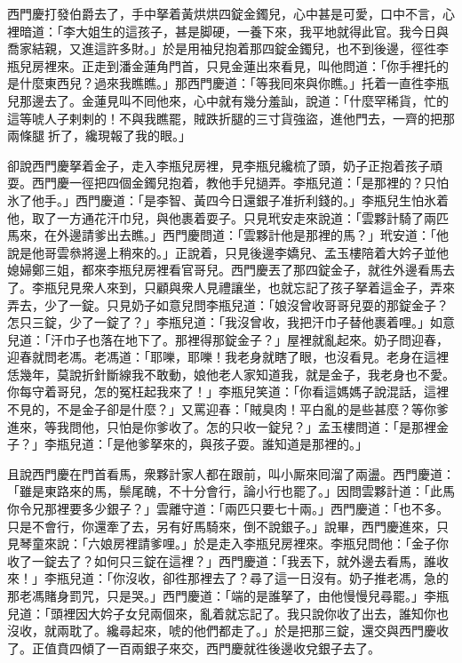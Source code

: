 西門慶打發伯爵去了，手中拏着黃烘烘四錠金鐲兒，心中甚是可愛，口中不言，心裡暗道：「李大姐生的這孩子，甚是脚硬，一養下來，我平地就得此官。我今日與喬家結親，又進這許多財。」於是用袖兒抱着那四錠金鐲兒，也不到後邊，徑徃李瓶兒房裡來。正走到潘金蓮角門首，只見金蓮出來看見，叫他問道：「你手裡托的是什麼東西兒？過來我瞧瞧。」那西門慶道：「等我囘來與你瞧。」托着一直徃李瓶兒那邊去了。{}金蓮見叫不囘他來，心中就有幾分羞訕，說道：「什麼罕稀貨，忙的這等唬人子剌剌的！不與我瞧罷，賊跌折腿的三寸貨強盜，進他門去，一齊的把那兩條腿𢱉折了，纔現報了我的眼。」

卻說西門慶拏着金子，走入李瓶兒房裡，見李瓶兒纔梳了頭，奶子正抱着孩子頑耍。西門慶一徑把四個金鐲兒抱着，教他手兒撾弄。李瓶兒道：「是那裡的？只怕氷了他手。」西門慶道：「是李智、黃四今日還銀子准折利錢的。」李瓶兒生怕氷着他，取了一方通花汗巾兒，與他裹着耍子。只見玳安走來說道：「雲夥計騎了兩匹馬來，在外邊請爹出去瞧。」西門慶問道：「雲夥計他是那裡的馬？」玳安道：「他說是他哥雲叅將邊上稍來的。」正說着，只見後邊李嬌兒、孟玉樓陪着大妗子並他媳婦鄭三姐，都來李瓶兒房裡看官哥兒。西門慶丟了那四錠金子，就徃外邊看馬去了。李瓶兒見衆人來到，只顧與衆人見禮讓坐，也就忘記了孩子拏着這金子，弄來弄去，少了一錠。只見奶子如意兒問李瓶兒道：「娘沒曾收哥哥兒耍的那錠金子？怎只三錠，少了一錠了？」李瓶兒道：「我沒曾收，我把汗巾子替他裹着哩。」如意兒道：「汗巾子也落在地下了。那裡得那錠金子？」屋裡就亂起來。奶子問迎春，迎春就問老馮。老馮道：「耶嚛，耶嚛！我老身就瞎了眼，也沒看見。老身在這裡恁幾年，莫說折針斷線我不敢動，娘他老人家知道我，就是金子，我老身也不愛。你每守着哥兒，怎的冤枉起我來了！」李瓶兒笑道：「你看這媽媽子說混話，這裡不見的，不是金子卻是什麼？」又罵迎春：「賊臭肉！平白亂的是些甚麼？等你爹進來，等我問他，只怕是你爹收了。怎的只收一錠兒？」孟玉樓問道：「是那裡金子？」李瓶兒道：「是他爹拏來的，與孩子耍。誰知道是那裡的。」

且說西門慶在門首看馬，衆夥計家人都在跟前，叫小厮來囘溜了兩盪。西門慶道：「雖是東路來的馬，鬃尾醜，不十分會行，論小行也罷了。」因問雲夥計道：「此馬你令兄那裡要多少銀子？」雲離守道：「兩匹只要七十兩。」西門慶道：「也不多。只是不會行，你還牽了去，另有好馬騎來，倒不說銀子。」說畢，西門慶進來，只見琴童來說：「六娘房裡請爹哩。」於是走入李瓶兒房裡來。李瓶兒問他：「金子你收了一錠去了？如何只三錠在這裡？」西門慶道：「我丟下，就外邊去看馬，誰收來！」李瓶兒道：「你沒收，卻徃那裡去了？尋了這一日沒有。奶子推老馮，急的那老馮賭身罰咒，只是哭。」西門慶道：「端的是誰拏了，由他慢慢兒尋罷。」李瓶兒道：「頭裡因大妗子女兒兩個來，亂着就忘記了。我只說你收了出去，誰知你也沒收，就兩耽了。纔尋起來，唬的他們都走了。」於是把那三錠，還交與西門慶收了。正值賁四傾了一百兩銀子來交，西門慶就徃後邊收兌銀子去了。

